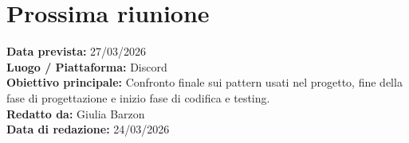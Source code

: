 \documentclass[a4paper,12pt]{article}
\begin{document}
\section*{Prossima riunione}
\textbf{Data prevista:} 27/03/2026 \\
\textbf{Luogo / Piattaforma:} Discord \\
\textbf{Obiettivo principale:} Confronto finale sui pattern usati nel progetto, fine della fase di progettazione e inizio fase di codifica e testing. \\


\textbf{Redatto da:} Giulia Barzon \\
\textbf{Data di redazione:} 24/03/2026
\end{document}
